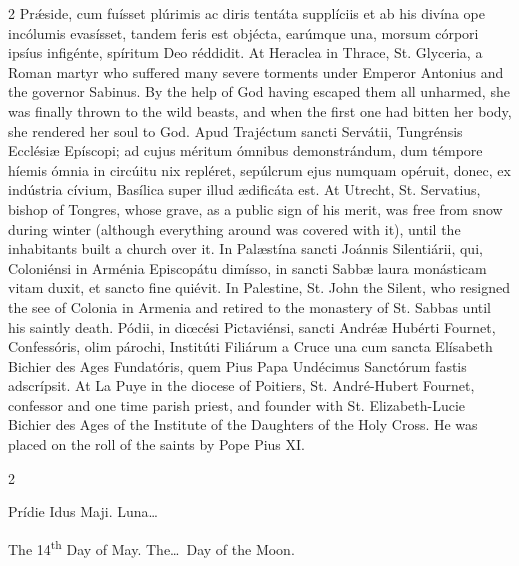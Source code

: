 \begin{paracol}{2}
 Prǽside, cum fuísset plúrimis ac diris tentáta supplíciis et ab his divína 
 ope incólumis evasísset, tandem feris est objécta, earúmque una, morsum 
 córpori ipsíus infigénte, spíritum Deo réddidit.
\switchcolumn
{}
At Heraclea in Thrace, St. Glyceria, 
 a Roman martyr who suffered many severe torments under Emperor Antonius and 
 the governor Sabinus. By the help of God having escaped them all 
 unharmed, she was finally thrown to the wild beasts, and when the first one had 
 bitten her body, she rendered her soul to God.
\switchcolumn*
{}
Apud Trajéctum sancti 
 Servátii, Tungrénsis Ecclésiæ Epíscopi; ad cujus méritum ómnibus 
 demonstrándum, dum témpore híemis ómnia in circúitu nix repléret, sepúlcrum 
 ejus numquam opéruit, donec, ex indústria cívium, Basílica super illud 
 ædificáta est.
\switchcolumn
{}
At Utrecht, St. Servatius, bishop 
 of Tongres, whose grave, as a public sign of his merit, was free from snow 
 during winter (although everything around was covered with it), until the 
 inhabitants built a church over it.
\switchcolumn*
{}
In Palæstína sancti 
 Joánnis Silentiárii, qui, Coloniénsi in Arménia Episcopátu dimísso, in 
 sancti Sabbæ laura monásticam vitam duxit, et sancto fine quiévit.
\switchcolumn
{}
In Palestine, St. John the Silent, 
 who resigned the see of Colonia in Armenia and retired to the monastery of 
 St. Sabbas until his saintly death.
\switchcolumn*
{}
Pódii, in diœcési 
 Pictaviénsi, sancti Andréæ Hubérti Fournet, Confessóris, olim párochi, 
 Institúti Filiárum a Cruce una cum sancta Elísabeth Bichier des Ages 
 Fundatóris, quem Pius Papa Undécimus Sanctórum fastis adscrípsit.
\switchcolumn
{}
At La Puye in the diocese of 
 Poitiers, St. André-Hubert Fournet, confessor and one time parish priest, 
 and founder with St. Elizabeth-Lucie Bichier des Ages of the Institute of 
 the Daughters of the Holy Cross. He was placed on the roll of the 
 saints by Pope Pius XI.
\switchcolumn*
{}
\end{paracol}


\begin{paracol}{2}
\begin{center}{\color{gregoriocolor} Prídie Idus Maji. 
 Luna\dots\ }\end{center}
\switchcolumn
{}
\begin{center}{\color{gregoriocolor} The 
 14\textsuperscript{th} Day of May. The\dots\ Day of the Moon.}\end{center}
\end{paracol}

